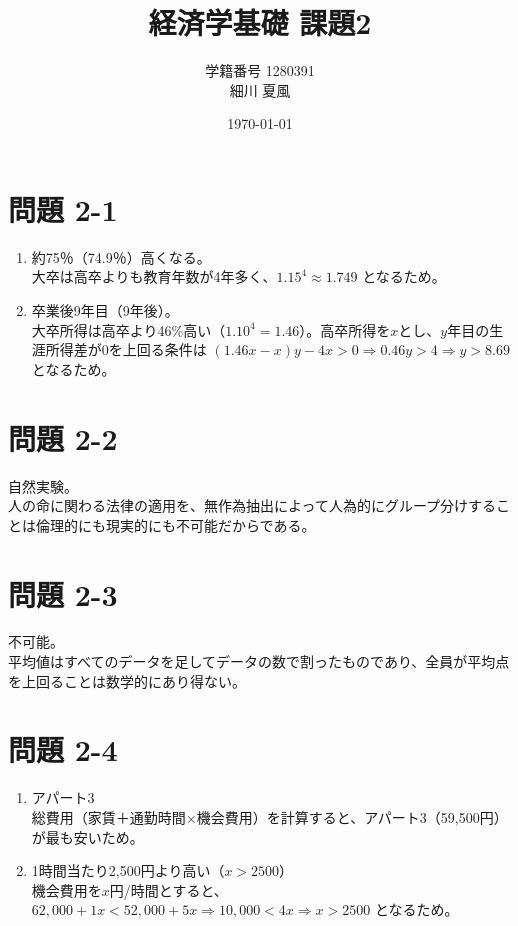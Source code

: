 \documentclass[paper=a4, fontsize=10pt]{jlreq}
\title{経済学基礎 課題2}
\author{学籍番号 1280391 \\ 細川 夏風}
\date{\today}
\begin{document}
\maketitle

\section*{問題 2-1}
\begin{enumerate}[1) ]
  \item 約75％（74.9％）高くなる。\\
  大卒は高卒よりも教育年数が4年多く、$1.15^4 \approx 1.749$ となるため。

  \item 卒業後9年目（9年後）。\\
  大卒所得は高卒より46\%高い（$1.10^4 = 1.46$）。高卒所得を$x$とし、$y$年目の生涯所得差が0を上回る条件は $(1.46x - x)y - 4x > 0 \Rightarrow 0.46y > 4 \Rightarrow y > 8.69$ となるため。
\end{enumerate}

\section*{問題 2-2}
自然実験。\\
人の命に関わる法律の適用を、無作為抽出によって人為的にグループ分けすることは倫理的にも現実的にも不可能だからである。

\section*{問題 2-3}
不可能。\\
平均値はすべてのデータを足してデータの数で割ったものであり、全員が平均点を上回ることは数学的にあり得ない。

\section*{問題 2-4}
\begin{enumerate}[1) ]
  \item アパート3\\
  総費用（家賃＋通勤時間×機会費用）を計算すると、アパート3（59,500円）が最も安いため。

  \item 1時間当たり2,500円より高い（$x > 2500$）\\
  機会費用を$x$円/時間とすると、$62,000 + 1x < 52,000 + 5x \Rightarrow 10,000 < 4x \Rightarrow x > 2500$ となるため。
\end{enumerate}
\end{document}
